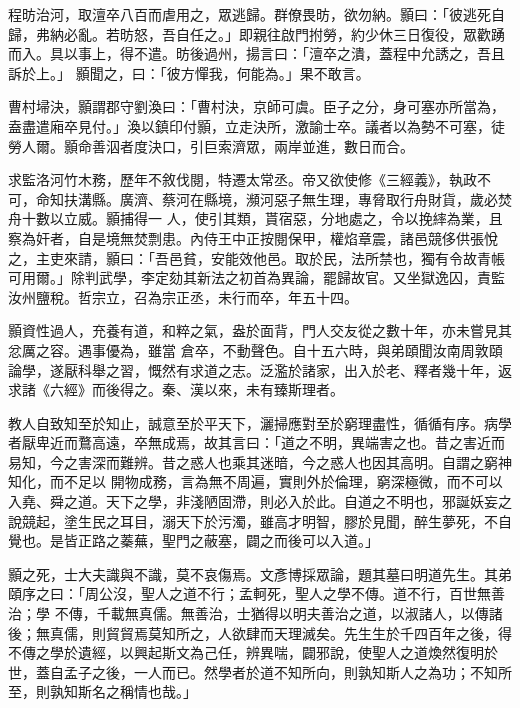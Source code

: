 \begin{pinyinscope}
 程昉治河，取澶卒八百而虐用之，眾逃歸。群僚畏昉，欲勿納。顥曰：「彼逃死自歸，弗納必亂。若昉怒，吾自任之。」即親往啟門拊勞，約少休三日復役，眾歡踴而入。具以事上，得不遣。昉後過州，揚言曰：「澶卒之潰，蓋程中允誘之，吾且訴於上。」
 顥聞之，曰：「彼方憚我，何能為。」果不敢言。



 曹村埽決，顥謂郡守劉渙曰：「曹村決，京師可虞。臣子之分，身可塞亦所當為，盍盡遣廂卒見付。」渙以鎮印付顥，立走決所，激諭士卒。議者以為勢不可塞，徒勞人爾。顥命善泅者度決口，引巨索濟眾，兩岸並進，數日而合。



 求監洛河竹木務，歷年不敘伐閱，特遷太常丞。帝又欲使修《三經義》，執政不可，命知扶溝縣。廣濟、蔡河在縣境，瀕河惡子無生理，專脅取行舟財貨，歲必焚舟十數以立威。顥捕得一
 人，使引其類，貰宿惡，分地處之，令以挽繂為業，且察為奸者，自是境無焚剽患。內侍王中正按閱保甲，權焰章震，諸邑競侈供張悅之，主吏來請，顥曰：「吾邑貧，安能效他邑。取於民，法所禁也，獨有令故青帳可用爾。」除判武學，李定劾其新法之初首為異論，罷歸故官。又坐獄逸囚，責監汝州鹽稅。哲宗立，召為宗正丞，未行而卒，年五十四。



 顥資性過人，充養有道，和粹之氣，盎於面背，門人交友從之數十年，亦未嘗見其忿厲之容。遇事優為，雖當
 倉卒，不動聲色。自十五六時，與弟頤聞汝南周敦頤論學，遂厭科舉之習，慨然有求道之志。泛濫於諸家，出入於老、釋者幾十年，返求諸《六經》而後得之。秦、漢以來，未有臻斯理者。



 教人自致知至於知止，誠意至於平天下，灑掃應對至於窮理盡性，循循有序。病學者厭卑近而鶩高遠，卒無成焉，故其言曰：「道之不明，異端害之也。昔之害近而易知，今之害深而難辨。昔之惑人也乘其迷暗，今之惑人也因其高明。自謂之窮神知化，而不足以
 開物成務，言為無不周遍，實則外於倫理，窮深極微，而不可以入堯、舜之道。天下之學，非淺陋固滯，則必入於此。自道之不明也，邪誕妖妄之說競起，塗生民之耳目，溺天下於污濁，雖高才明智，膠於見聞，醉生夢死，不自覺也。是皆正路之蓁蕪，聖門之蔽塞，闢之而後可以入道。」



 顥之死，士大夫識與不識，莫不哀傷焉。文彥博採眾論，題其墓曰明道先生。其弟頤序之曰：「周公沒，聖人之道不行；孟軻死，聖人之學不傳。道不行，百世無善治；學
 不傳，千載無真儒。無善治，士猶得以明夫善治之道，以淑諸人，以傳諸後；無真儒，則貿貿焉莫知所之，人欲肆而天理滅矣。先生生於千四百年之後，得不傳之學於遺經，以興起斯文為己任，辨異喘，闢邪說，使聖人之道煥然復明於世，蓋自孟子之後，一人而已。然學者於道不知所向，則孰知斯人之為功；不知所至，則孰知斯名之稱情也哉。」




\end{pinyinscope}
